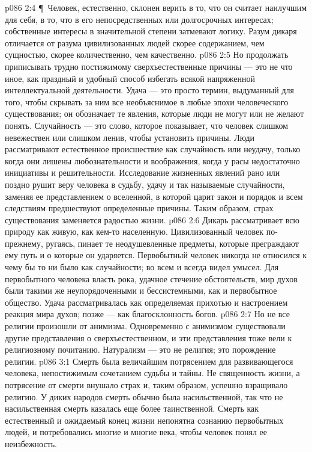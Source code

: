 \vs p086 2:4 \P\ Человек, естественно, склонен верить в то, что он считает наилучшим для себя, в то, что в его непосредственных или долгосрочных интересах; собственные интересы в значительной степени затмевают логику. Разум дикаря отличается от разума цивилизованных людей скорее содержанием, чем сущностью, скорее количественно, чем качественно.
\vs p086 2:5 Но продолжать приписывать трудно постижимому сверхъестественные причины --- это не что иное, как праздный и удобный способ избегать всякой напряженной интеллектуальной деятельности. Удача --- это просто термин, выдуманный для того, чтобы скрывать за ним все необъяснимое в любые эпохи человеческого существования; он обозначает те явления, которые люди не могут или не желают понять. Случайность --- это слово, которое показывает, что человек слишком невежествен или слишком ленив, чтобы установить причины. Люди рассматривают естественное происшествие как случайность или неудачу, только когда они лишены любознательности и воображения, когда у расы недостаточно инициативы и решительности. Исследование жизненных явлений рано или поздно рушит веру человека в судьбу, удачу и так называемые случайности, заменяя ее представлением о вселенной, в которой царит закон и порядок и всем следствиям предшествуют определенные причины. Таким образом, страх существования заменяется радостью жизни.
\vs p086 2:6 Дикарь рассматривает всю природу как живую, как кем\hyp{}то населенную. Цивилизованный человек по\hyp{}прежнему, ругаясь, пинает те неодушевленные предметы, которые преграждают ему путь и о которые он ударяется. Первобытный человек никогда не относился к чему бы то ни было как случайности; во всем и всегда видел умысел. Для первобытного человека власть рока, удачное стечение обстоятельств, мир духов были такими же неупорядоченными и бессистемными, как и первобытное общество. Удача рассматривалась как определяемая прихотью и настроением реакция мира духов; позже --- как благосклонность богов.
\vs p086 2:7 Но не все религии произошли от анимизма. Одновременно с анимизмом существовали другие представления о сверхъестественном, и эти представления тоже вели к религиозному почитанию. Натурализм --- это не религия; это порождение религии.
\vs p086 3:1 Смерть была величайшим потрясением для развивающегося человека, непостижимым сочетанием судьбы и тайны. Не священность жизни, а потрясение от смерти внушало страх и, таким образом, успешно взращивало религию. У диких народов смерть обычно была насильственной, так что не насильственная смерть казалась еще более таинственной. Смерть как естественный и ожидаемый конец жизни непонятна сознанию первобытных людей, и потребовались многие и многие века, чтобы человек понял ее неизбежность.
